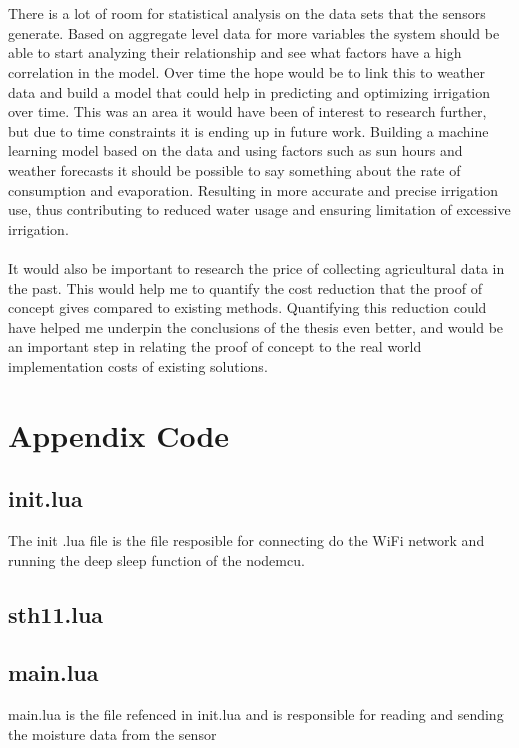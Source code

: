 \documentclass[]{uiophd}
\begin{document}
\\\\
There is a lot of room for statistical analysis on the data sets that the sensors generate. Based on aggregate level data for more variables the system should be able to start analyzing their relationship and see what factors have a high correlation in the model. Over time the hope would be to link this to weather data and build a model that could help in predicting and optimizing irrigation over time. This was an area it would have been of interest to research further, but due to time constraints it is ending up in future work. Building a machine learning model based on the data and using factors such as sun hours and weather forecasts it should be possible to say something about the rate of consumption and evaporation. Resulting in more accurate and precise irrigation use, thus contributing to reduced water usage and ensuring limitation of excessive irrigation.
\\\\
It would also be important to research the price of collecting agricultural data in the past. This would help me to quantify the cost reduction that the proof of concept gives compared to existing methods. Quantifying this reduction could have helped me underpin the conclusions of the thesis even better, and would be an important step in relating the proof of concept to the real world implementation costs of existing solutions.

\printbibliography

\chapter*{Appendix Code}
\linespread{1}

\section*{init.lua}
The init .lua file is the file resposible for connecting do the WiFi network and running the deep sleep function of the nodemcu.


\section*{sth11.lua}


\section*{main.lua}
main.lua is the file refenced in init.lua and is responsible for reading and sending the moisture data from the sensor

\end{document}

